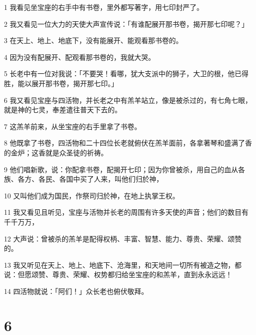 \par 1 我看见坐宝座的右手中有书卷，里外都写著字，用七印封严了。
\par 2 我又看见一位大力的天使大声宣传说：「有谁配展开那书卷，揭开那七印呢？」
\par 3 在天上、地上、地底下，没有能展开、能观看那书卷的。
\par 4 因为没有配展开、配观看那书卷的，我就大哭。
\par 5 长老中有一位对我说：「不要哭！看哪，犹大支派中的狮子，大卫的根，他已得胜，能以展开那书卷，揭开那七印。」
\par 6 我又看见宝座与四活物，并长老之中有羔羊站立，像是被杀过的，有七角七眼，就是神的七灵，奉差遣往普天下去的。
\par 7 这羔羊前来，从坐宝座的右手里拿了书卷。
\par 8 他既拿了书卷，四活物和二十四位长老就俯伏在羔羊面前，各拿著琴和盛满了香的金炉；这香就是众圣徒的祈祷。
\par 9 他们唱新歌，说：你配拿书卷，配揭开七印；因为你曾被杀，用自己的血从各族、各方、各民、各国中买了人来，叫他们归於神，
\par 10 又叫他们成为国民，作祭司归於神，在地上执掌王权。
\par 11 我又看见且听见，宝座与活物并长老的周围有许多天使的声音；他们的数目有千千万万，
\par 12 大声说：曾被杀的羔羊是配得权柄、丰富、智慧、能力、尊贵、荣耀、颂赞的。
\par 13 我又听见在天上、地上、地底下、沧海里，和天地间一切所有被造之物，都说：但愿颂赞、尊贵、荣耀、权势都归给坐宝座的和羔羊，直到永永远远！
\par 14 四活物就说：「阿们！」众长老也俯伏敬拜。

\chapter{6}

